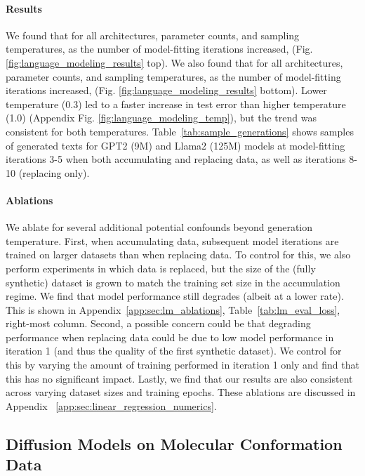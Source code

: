 \paragraph{Results}
We found that for all architectures, parameter counts, and sampling temperatures, as the number of model-fitting iterations increased,  (Fig. \ref{fig:language_modeling_results} top). We also found that for all architectures, parameter counts, and sampling temperatures, as the number of model-fitting iterations increased,  (Fig. \ref{fig:language_modeling_results} bottom). Lower temperature (0.3) led to a faster increase in test error than higher temperature (1.0) (Appendix Fig. \ref{fig:language_modeling_temp}), but the trend was consistent for both temperatures. Table~\ref{tab:sample_generations} shows samples of generated texts for GPT2 (9M) and Llama2 (125M) models at model-fitting iterations 3-5 when both accumulating and replacing data, as well as iterations 8-10 (replacing only).

\paragraph{Ablations} 
We ablate for several additional potential confounds beyond generation temperature. First, when accumulating data, subsequent model iterations are trained on larger datasets than when replacing data. To control for this, we also perform experiments in which data is replaced, but the size of the (fully synthetic) dataset is grown to match the training set size in the accumulation regime. We find that model performance still degrades (albeit at a lower rate). This is shown in Appendix~\ref{app:sec:lm_ablations}, Table~\ref{tab:lm_eval_loss}, right-most column.
Second, a possible concern could be that degrading performance when replacing data could be due to low model performance in iteration 1 (and thus the quality of the first synthetic dataset). We control for this by varying the amount of training performed in iteration 1 only and find that this has no significant impact.
Lastly, we find that our results are also consistent across varying dataset sizes and training epochs. These ablations are discussed in Appendix ~\ref{app:sec:linear_regression_numerics}.

\subsection{Diffusion Models on Molecular Conformation Data}
\label{sec:real:subsec:molecular_diffusion}

